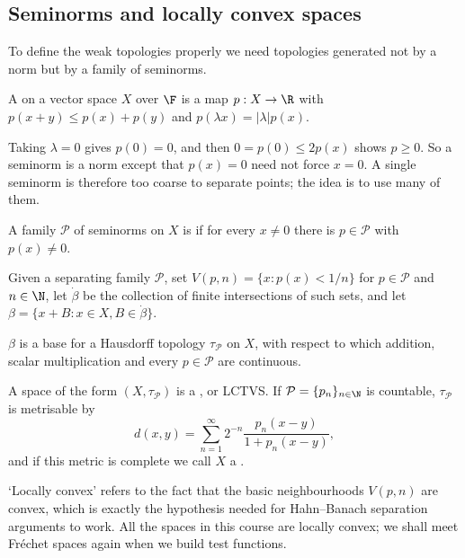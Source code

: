 \subsection{Seminorms and locally convex spaces}

To define the weak topologies properly we need topologies generated not by a norm but by a family of seminorms.

\begin{definition}[Seminorm]
	A  on a vector space $X$ over $\F$ is a map $p : X \to \R$ with $p(x+y)\le p(x)+p(y)$ and $p(\lambda x) = |\lambda| p(x)$.
\end{definition}

Taking $\lambda = 0$ gives $p(0) = 0$, and then $0 = p(0) \le 2p(x)$ shows $p \ge 0$. So a seminorm is a norm except that $p(x) = 0$ need not force $x = 0$. A single seminorm is therefore too coarse to separate points; the idea is to use many of them.

\begin{definition}
	A family $\mathcal{P}$ of seminorms on $X$ is  if for every $x \ne 0$ there is $p \in \mathcal{P}$ with $p(x) \ne 0$.
\end{definition}

Given a separating family $\mathcal{P}$, set $V(p,n) = \{x : p(x) < 1/n\}$ for $p \in \mathcal{P}$ and $n \in \N$, let $\dot\beta$ be the collection of finite intersections of such sets, and let $\beta = \{x + B : x \in X, B \in \dot\beta\}$.

\begin{theorem}\label{thm:lctvs}
	$\beta$ is a base for a Hausdorff topology $\tau_{\mathcal{P}}$ on $X$, with respect to which addition, scalar multiplication and every $p \in \mathcal{P}$ are continuous.
\end{theorem}

\begin{definition}
	A space of the form $(X, \tau_\mathcal{P})$ is a , or LCTVS. If $\mathcal{P} = \{p_n\}_{n \in \N}$ is countable, $\tau_\mathcal{P}$ is metrisable by
	$$d(x,y) = \sum_{n=1}^\infty 2^{-n} \frac{p_n(x-y)}{1 + p_n(x-y)},$$
	and if this metric is complete we call $X$ a .
\end{definition}

`Locally convex' refers to the fact that the basic neighbourhoods $V(p,n)$ are convex, which is exactly the hypothesis needed for Hahn--Banach separation arguments to work. All the spaces in this course are locally convex; we shall meet Fr\'echet spaces again when we build test functions.

